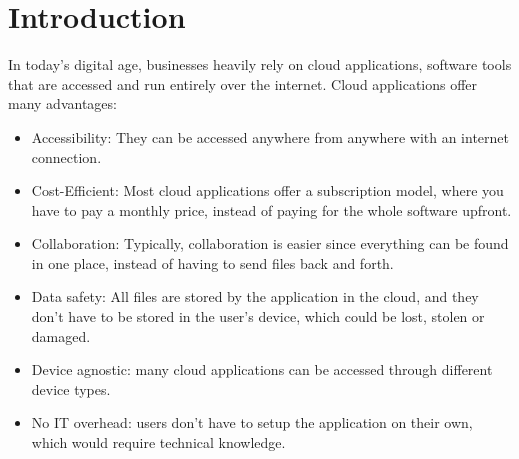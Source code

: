 \chapter{Introduction}
\label{cha:introduction}





In today's digital age, businesses heavily rely on cloud applications, software tools that
are accessed and run entirely over the internet. Cloud applications offer many advantages:

\begin{itemize}
    \item Accessibility: They can be accessed anywhere from anywhere with an internet connection.
    \item Cost-Efficient: Most cloud applications offer a subscription model, where you have to pay a monthly price, instead of paying for the whole software upfront.
    \item Collaboration: Typically, collaboration is easier since everything can be found
      in one place, instead of having to send files back and forth.
    \item Data safety: All files are stored by the application in the cloud, and they don't
      have to be stored in the user's device, which could be lost, stolen or damaged.
    \item Device agnostic: many cloud applications can be accessed through different device types.  
    \item No IT overhead: users don't have to setup the application on their own, which would require technical knowledge.
\end{itemize}

